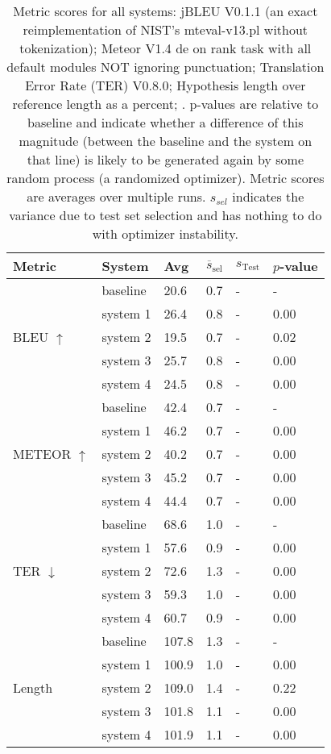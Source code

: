 \begin{table}[htb]
\begin{center}
\begin{footnotesize}
\begin{tabular}{|l|l|l|l|l|l|}
\hline
\bf Metric & \bf System & \bf Avg & \bf $\overline{s}_{\text{sel}}$ & \bf $s_{\text{Test}}$ & \bf $p$-value \\
\hline
\multirow{5}{*}{BLEU $\uparrow$}
& baseline & 20.6 & 0.7 & - & - \\
& system 1 & 26.4 & 0.8 & - & 0.00 \\
& system 2 & 19.5 & 0.7 & - & 0.02 \\
& system 3 & 25.7 & 0.8 & - & 0.00 \\
& system 4 & 24.5 & 0.8 & - & 0.00 \\
\hline
\multirow{5}{*}{METEOR $\uparrow$}
& baseline & 42.4 & 0.7 & - & - \\
& system 1 & 46.2 & 0.7 & - & 0.00 \\
& system 2 & 40.2 & 0.7 & - & 0.00 \\
& system 3 & 45.2 & 0.7 & - & 0.00 \\
& system 4 & 44.4 & 0.7 & - & 0.00 \\
\hline
\multirow{5}{*}{TER $\downarrow$}
& baseline & 68.6 & 1.0 & - & - \\
& system 1 & 57.6 & 0.9 & - & 0.00 \\
& system 2 & 72.6 & 1.3 & - & 0.00 \\
& system 3 & 59.3 & 1.0 & - & 0.00 \\
& system 4 & 60.7 & 0.9 & - & 0.00 \\
\hline
\multirow{5}{*}{Length }
& baseline & 107.8 & 1.3 & - & - \\
& system 1 & 100.9 & 1.0 & - & 0.00 \\
& system 2 & 109.0 & 1.4 & - & 0.22 \\
& system 3 & 101.8 & 1.1 & - & 0.00 \\
& system 4 & 101.9 & 1.1 & - & 0.00 \\
\hline
\end{tabular}
\end{footnotesize}
\end{center}
\caption{\label{tab:scores} Metric scores for all systems: jBLEU V0.1.1 (an exact reimplementation of NIST's mteval-v13.pl without tokenization); Meteor V1.4 de on rank task with all default modules NOT ignoring punctuation; Translation Error Rate (TER) V0.8.0; Hypothesis length over reference length as a percent; . p-values are relative to baseline and indicate whether a difference of this magnitude (between the baseline and the system on that line) is likely to be generated again by some random process (a randomized optimizer). Metric scores are averages over multiple runs. $s_{sel}$ indicates the variance due to test set selection and has nothing to do with optimizer instability.}
\end{table}
